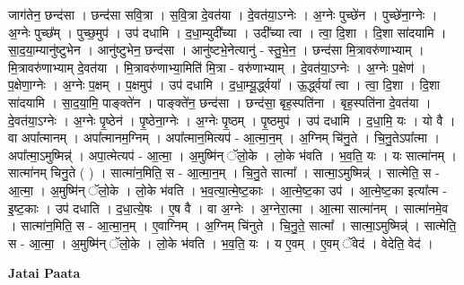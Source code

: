 \documentclass[17pt]{extarticle}
\begin{document}
जाग॑तेन॒ छन्द॑सा । छन्द॑सा सवि॒त्रा । स॒वि॒त्रा दे॒वत॑या । दे॒वत॑या॒ऽग्नेः । अ॒ग्नेः पुच्छे॑न । पुच्छे॑ना॒ग्नेः । अ॒ग्नेः पुच्छ᳚म् । पुच्छ॒मुप॑ । उप॑ दधामि । द॒धा॒म्युदी᳚च्या । उदी᳚च्या त्वा । त्वा॒ दि॒शा । दि॒शा सा॑दयामि । सा॒द॒या॒म्यानु॑ष्टुभेन । आनु॑ष्टुभेन॒ छन्द॑सा । आनु॑ष्टभे॒नेत्यानु॑ - स्तु॒भे॒न॒ । छन्द॑सा मि॒त्रावरु॑णाभ्याम् । मि॒त्रावरु॑णाभ्याम् दे॒वत॑या । मि॒त्रावरु॑णाभ्या॒मिति॑ मि॒त्रा - वरु॑णाभ्याम् । दे॒वत॑या॒ऽग्नेः । अ॒ग्नेः प॒क्षेण॑ । प॒क्षेणा॒ग्नेः । अ॒ग्नेः प॒क्षम् । प॒क्षमुप॑ । उप॑ दधामि । द॒धा॒म्यू॒र्द्ध्वया᳚ । ऊ॒र्द्ध्वया᳚ त्वा । त्वा॒ दि॒शा । दि॒शा सा॑दयामि । सा॒द॒या॒मि॒ पाङ्क्ते॑न । पाङ्क्ते॑न॒ छन्द॑सा । छन्द॑सा॒ बृह॒स्पति॑ना । बृह॒स्पति॑ना दे॒वत॑या । दे॒वत॑या॒ऽग्नेः । अ॒ग्नेः पृ॒ष्ठेन॑ । पृ॒ष्ठेना॒ग्नेः । अ॒ग्नेः पृ॒ष्ठम् । पृ॒ष्ठमुप॑ । उप॑ दधामि । द॒धा॒मि॒ यः । यो वै । वा अपा᳚त्मानम् । अपा᳚त्मानम॒ग्निम् । अपा᳚त्मान॒मित्यप॑ - आ॒त्मा॒न॒म् । अ॒ग्निम् चि॑नु॒ते । चि॒नु॒तेऽपा᳚त्मा । अपा᳚त्मा॒ऽमुष्मिन्न्॑ । अपा॒त्मेत्यप॑ - आ॒त्मा॒ । अ॒मुष्मि॑न् ॅलो॒के । लो॒के भ॑वति । भ॒व॒ति॒ यः । यः सात्मा॑नम् । सात्मा॑नम् चिनु॒ते ( ) । सात्मा॑न॒मिति॒ स - आ॒त्मा॒न॒म् । चि॒नु॒ते सात्मा᳚ । सात्मा॒ऽमुष्मिन्न्॑ । सात्मेति॒ स - आ॒त्मा॒ । अ॒मुष्मि॑न् ॅलो॒के । लो॒के भ॑वति । भ॒व॒त्या॒त्मे॒ष्ट॒काः । आ॒त्मे॒ष्ट॒का उप॑ । आ॒त्मे॒ष्ट॒का इत्या᳚त्म - इ॒ष्ट॒काः । उप॑ दधाति । द॒धा॒त्ये॒षः । ए॒ष वै । वा अ॒ग्नेः । अ॒ग्नेरा॒त्मा । आ॒त्मा सात्मा॑नम् । सात्मा॑नमे॒व । सात्मा॑न॒मिति॒ स - आ॒त्मा॒न॒म् । ए॒वाग्निम् । अ॒ग्निम् चि॑नुते । चि॒नु॒ते॒ सात्मा᳚ । सात्मा॒ऽमुष्मिन्न्॑ । सात्मेति॒ स - आ॒त्मा॒ । अ॒मुष्मि॑न् ॅलो॒के । लो॒के भ॑वति । भ॒व॒ति॒ यः । य ए॒वम् । ए॒वम् ॅवेद॑ । वेदेति॒ वेद॑ । \newline

\textbf{Jatai Paata} \newline
\end{document}

